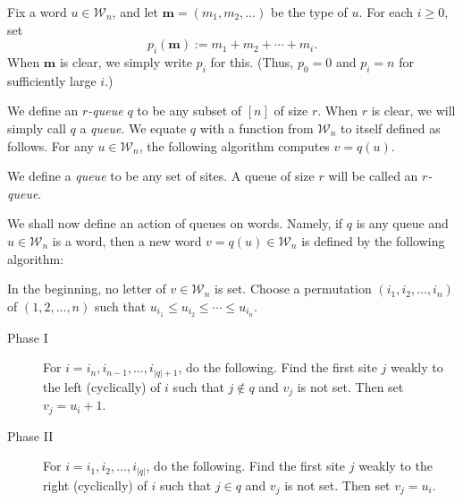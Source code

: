 \documentclass[reqno]{amsart}%
\newcommand{\0}{\phantom{c}}
\newenvironment{verlong}{}{}
\newenvironment{vershort}{}{}
\newcommand{\defn}[1]{{\color{darkred}\emph{#1}}}
\theoremstyle{plain}
\theoremstyle{definition}
\numberwithin{equation}{section}
\newcommand{\travis}[1]{\todo[size=\tiny,color=blue!30]{#1 \\ \hfill --- Travis}}
\begin{document}
Fix a word $u \in\mathcal{W}_{n}$, and let $\mathbf{m} = (m_{1}, m_{2},
\ldots)$ be the type of $u$. For each $i \geq0$, set
\begin{equation}
\label{eq:type_partial_sums}p_{i}(\mathbf{m}) := m_{1} + m_{2} + \cdots+
m_{i}.
\end{equation}
When $\mathbf{m}$ is clear, we simply write $p_{i}$ for this. (Thus, $p_{0} =
0$ and $p_{i} = n$ for sufficiently large $i$.)

\begin{vershort}
We define an \defn{$r$-queue} $q$ to be any subset of $\left[  n \right]  $ of
size $r$. When $r$ is clear, we will simply call $q$ a \defn{queue}. We equate
$q$ with a function from $\mathcal{W}_{n}$ to itself defined as follows. For
any $u \in\mathcal{W}_{n}$, the following algorithm computes $v = q(u)$.
\end{vershort}

\begin{verlong}
We define a \defn{queue} to be any set of sites.
A queue of size $r$ will be called an \defn{$r$-queue}.


We shall now define an action of queues on words. Namely, if $q$ is any queue
and $u \in\mathcal{W}_{n}$ is a word, then a new word $v = q(u) \in
\mathcal{W}_{n}$ is defined by the following algorithm:
\end{verlong}

In the beginning, no letter of $v \in\mathcal{W}_{n}$ is set. Choose a
permutation $\left(  i_{1}, i_{2}, \ldots, i_{n} \right)  $ of $\left(  1, 2,
\ldots, n \right)  $ such that $u_{i_{1}} \leq u_{i_{2}} \leq\cdots\leq
u_{i_{n}}$.

\begin{description}
\item[Phase I] For $i = i_{n}, i_{n-1}, \ldots, i_{\left|  q \right|  +1}$, do
the following. Find the first site $j$ weakly to the left (cyclically) of $i$
such that $j \notin q$ and $v_{j}$ is not set. Then set $v_{j} = u_{i} + 1$.

\item[Phase II] For $i = i_{1}, i_{2}, \ldots, i_{\left|  q \right|  }$, do
the following. Find the first site $j$ weakly to the right (cyclically) of $i$
such that $j \in q$ and $v_{j}$ is not set. Then set $v_{j} = u_{i}$.
\end{description}
\end{document}
